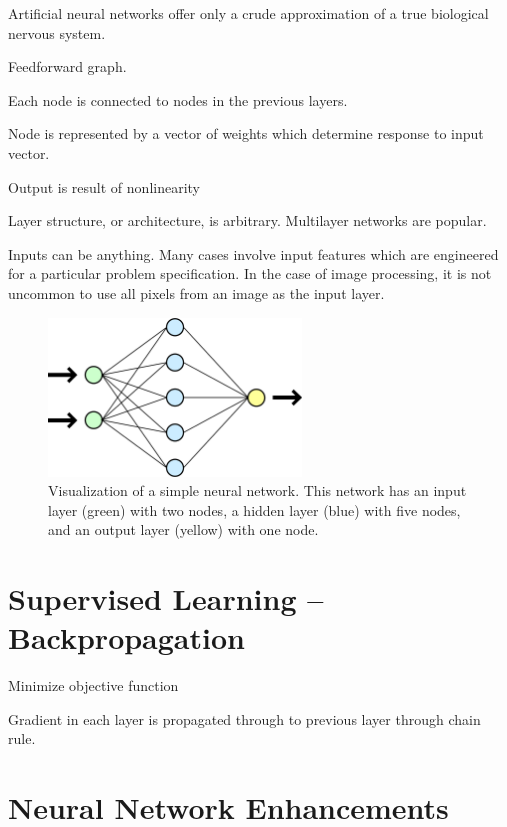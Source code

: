 Artificial neural networks offer only a crude approximation of a true biological nervous system. 



Feedforward graph. \cite{reed1999neural}

Each node is connected to nodes in the previous layers.  

Node is represented by a vector of weights which determine response to input vector.  


Output is result of nonlinearity

Layer structure, or architecture, is arbitrary.  Multilayer networks are popular. 


Inputs can be anything.  Many cases involve input features which are engineered for a particular problem specification.  In the case of image processing, it is not uncommon to use all pixels from an image as the input layer.  

\begin{figure}[t]
  \begin{center}
    \includegraphics[width=0.6\textwidth]{figures/figures/basicNN.png}
  \end{center}
  \caption[Visualization of a simple neural network ]{Visualization of a simple neural network.  This network has an input layer (green) with two nodes, a hidden layer (blue) with five nodes, and an output layer (yellow) with one node.}

  \label{nnet}
\end{figure}


\section{Supervised Learning -- Backpropagation}


Minimize objective function 

Gradient in each layer is propagated through to previous layer through chain rule. 



\section{Neural Network Enhancements}

